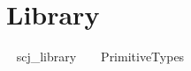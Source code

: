 \section{Library}
\vspace{-0.75em}

\begin{zsection}
  \SECTION ~ scj\_library ~ \parents ~ PrimitiveTypes
\end{zsection}
